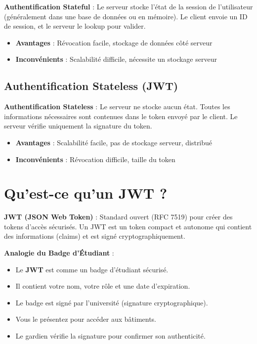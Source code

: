 \begin{definitionbox}
    \textbf{Authentification Stateful} : Le serveur stocke l'état de la session de l'utilisateur (généralement dans une base de données ou en mémoire). Le client envoie un ID de session, et le serveur le lookup pour valider.
\end{definitionbox}

\begin{itemize}
    \item \textbf{Avantages} : Révocation facile, stockage de données côté serveur
    \item \textbf{Inconvénients} : Scalabilité difficile, nécessite un stockage serveur
\end{itemize}

\subsection{Authentification Stateless (JWT)}

\begin{definitionbox}
    \textbf{Authentification Stateless} : Le serveur ne stocke aucun état. Toutes les informations nécessaires sont contenues dans le token envoyé par le client. Le serveur vérifie uniquement la signature du token.
\end{definitionbox}

\begin{itemize}
    \item \textbf{Avantages} : Scalabilité facile, pas de stockage serveur, distribué
    \item \textbf{Inconvénients} : Révocation difficile, taille du token
\end{itemize}

\section{Qu'est-ce qu'un JWT ?}

\begin{definitionbox}
    \textbf{JWT (JSON Web Token)} : Standard ouvert (RFC 7519) pour créer des tokens d'accès sécurisés. Un JWT est un token compact et autonome qui contient des informations (claims) et est signé cryptographiquement.
\end{definitionbox}

\begin{analogybox}
    \textbf{Analogie du Badge d'Étudiant} :
    \begin{itemize}
        \item Le \textbf{JWT} est comme un badge d'étudiant sécurisé.
        \item Il contient votre nom, votre rôle et une date d'expiration.
        \item Le badge est signé par l'université (signature cryptographique).
        \item Vous le présentez pour accéder aux bâtiments.
        \item Le gardien vérifie la signature pour confirmer son authenticité.
    \end{itemize}
\end{analogybox}

